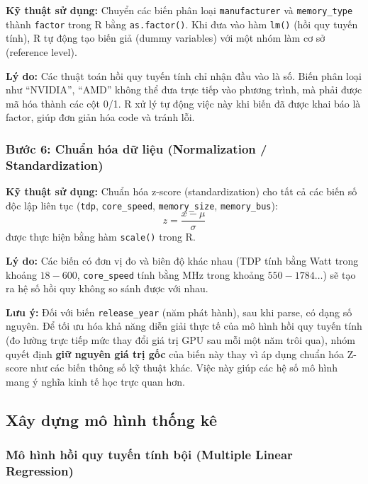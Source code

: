 \documentclass[12pt,a4paper]{article}
\begin{document}
\textbf{Kỹ thuật sử dụng:} Chuyển các biến phân loại \texttt{manufacturer} và
\texttt{memory\_type} thành \texttt{factor} trong R bằng \texttt{as.factor()}. Khi đưa
vào hàm \texttt{lm()} (hồi quy tuyến tính), R tự động tạo biến giả (dummy variables)
với một nhóm làm cơ sở (reference level).

\textbf{Lý do:} Các thuật toán hồi quy tuyến tính chỉ nhận đầu vào là số. Biến phân loại
như ``NVIDIA'', ``AMD'' không thể đưa trực tiếp vào phương trình, mà phải được mã hóa
thành các cột 0/1. R xử lý tự động việc này khi biến đã được khai báo là factor, giúp
đơn giản hóa code và tránh lỗi.

\subsubsection*{Bước 6: Chuẩn hóa dữ liệu (Normalization / Standardization)}

\textbf{Kỹ thuật sử dụng:} Chuẩn hóa z-score (standardization) cho tất cả các biến số
độc lập liên tục (\texttt{tdp}, \texttt{core\_speed}, \texttt{memory\_size},
\texttt{memory\_bus}):
\[
  z = \frac{x - \mu}{\sigma}
\]
được thực hiện bằng hàm \texttt{scale()} trong R.

\textbf{Lý do:} Các biến có đơn vị đo và biên độ khác nhau (TDP tính bằng Watt trong
khoảng $18 - 600$, \texttt{core\_speed} tính bằng MHz trong khoảng $550 - 1784\ldots$)
sẽ tạo ra hệ số hồi quy không so sánh được với nhau.

\textbf{Lưu ý:} Đối với biến \texttt{release\_year} (năm phát hành), sau khi parse, có
dạng số nguyên. Để tối ưu hóa khả năng diễn giải thực tế của mô hình hồi quy tuyến tính
(đo lường trực tiếp mức thay đổi giá trị GPU sau mỗi một năm trôi qua), nhóm quyết định
\textbf{giữ nguyên giá trị gốc} của biến này thay vì áp dụng chuẩn hóa Z-score như các
biến thông số kỹ thuật khác. Việc này giúp các hệ số mô hình mang ý nghĩa kinh tế học
trực quan hơn.

\subsection{Xây dựng mô hình thống kê}

\subsubsection{Mô hình hồi quy tuyến tính bội (Multiple Linear Regression)}
\end{document}
